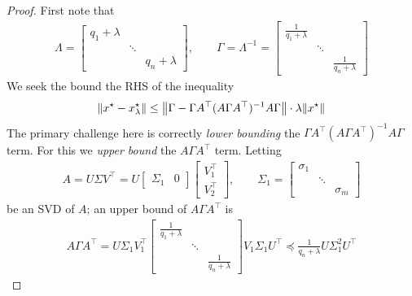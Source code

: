 \documentclass[12pt]{article}
\begin{document}
\begin{proof}
  First note that
  \begin{align*}
    \Lambda =
      \begin{bmatrix}
        q_1 + \lambda & & \\ & \ddots & \\ & & q_n + \lambda
      \end{bmatrix},
      \qquad
      \Gamma = \Lambda^{-1}
        = \begin{bmatrix}
            \frac{1}{q_1 + \lambda} & & \\
            & \ddots & \\
            & & \frac{1}{q_n + \lambda}
          \end{bmatrix}
  \end{align*}
  We seek the bound the RHS of the inequality
  \begin{align*}
    {\left\lVert x^\star - x_\lambda ^\star\right\rVert}
      \leq {\left\lVert\Gamma - \Gamma A^\top (A \Gamma A^\top)^{-1} A \Gamma\right\rVert}
          \cdot \lambda {\left\lVert x^\star\right\rVert}
  \end{align*}
  The primary challenge here is
  correctly \textit{lower bounding} the
  \(\Gamma A^\top (A \Gamma A^\top)^{-1} A \Gamma\) term.
  For this we \textit{upper bound} the \(A \Gamma A^\top\) term.
  Letting
  \begin{align*}
    A = U \Sigma V^\top
      = U \begin{bmatrix} \Sigma_1 & 0 \end{bmatrix}
          \begin{bmatrix} V_1 ^\top \\ V_2 ^\top \end{bmatrix},
        \qquad \Sigma_1 =
        \begin{bmatrix} \sigma_1 & & \\ & \ddots & \\ & & \sigma_m \end{bmatrix}
  \end{align*}
  be an SVD of \(A\); an upper bound of \(A \Gamma A^\top\) is
  \begin{align*}
    A \Gamma A^\top
      = U \Sigma_1 V_1 ^\top
          \begin{bmatrix}
            \frac{1}{q_1 + \lambda} & & \\
            & \ddots & \\
            & & \frac{1}{q_n + \lambda}
          \end{bmatrix}
          V_1 \Sigma_1 U^\top
      \preceq \frac{1}{q_n + \lambda} U \Sigma_1 ^2 U^\top

\end{align*}
\end{proof}
\end{document}
